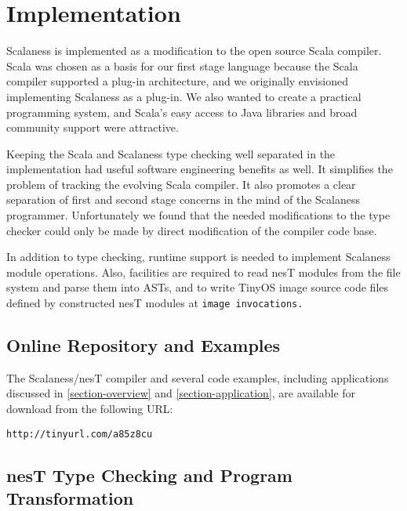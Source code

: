 \section{Implementation}
\label{section-implementation}

Scalaness is implemented as a modification to the open source Scala compiler. Scala was chosen
as a basis for our first stage language because the Scala compiler supported a plug-in
architecture, and we originally envisioned implementing Scalaness as a plug-in. We also wanted
to create a practical programming system, and Scala's easy access to Java libraries and broad
community support were attractive.

Keeping the Scala and Scalaness type checking well separated in the implementation had useful
software engineering benefits as well. It simplifies the problem of tracking the evolving Scala
compiler. It also promotes a clear separation of first and second stage concerns in the mind of
the Scalaness programmer. Unfortunately we found that the needed modifications to the type
checker could only be made by direct modification of the compiler code base.

In addition to type checking, runtime support is needed to implement Scalaness module
operations. Also, facilities are required to read nesT modules from the file system and parse
them into ASTs, and to write TinyOS image source code files defined by constructed nesT modules
at \tt{image} invocations.

\subsection{Online Repository and Examples}

The Scalaness/nesT compiler and several code examples, including applications discussed in
\autoref{section-overview} and \autoref{section-application}, are available for download from 
the following URL:
\vspace{0.8em}

\centerline{\texttt{http://tinyurl.com/a85z8cu}}


\subsection{nesT Type Checking and Program Transformation}

